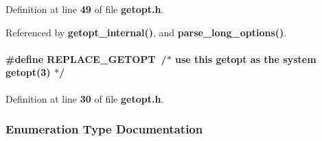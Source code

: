 Definition at line {\bf 49} of file {\bf getopt.\+h}.



Referenced by {\bf getopt\+\_\+internal()}, and {\bf parse\+\_\+long\+\_\+options()}.

\paragraph[{R\+E\+P\+L\+A\+C\+E\+\_\+\+G\+E\+T\+O\+PT}]{\setlength{\rightskip}{0pt plus 5cm}\#define R\+E\+P\+L\+A\+C\+E\+\_\+\+G\+E\+T\+O\+PT~/$\ast$ use this {\bf getopt} as the {\bf system} {\bf getopt}(3) $\ast$/}\label{limesuite-dev_2external_2msvc_2getopt_8h_a77fd2f19b813fdd8d7d4964c550485f8}


Definition at line {\bf 30} of file {\bf getopt.\+h}.



\subsubsection{Enumeration Type Documentation}
